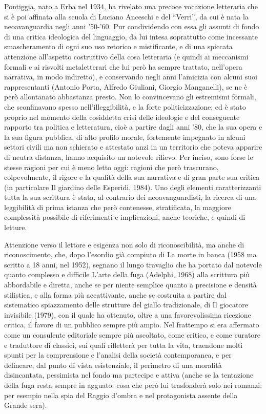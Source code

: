 Pontiggia, nato a Erba nel 1934, ha rivelato una precoce vocazione letteraria che si è poi affinata  alla scuola di Luciano Anceschi e del “Verri”, da cui è nata la neoavanguardia negli anni ’50-’60. Pur condividendo con essa gli assunti di fondo di una critica ideologica del linguaggio, da lui intesa soprattutto come incessante smascheramento di ogni suo uso retorico e mistificante, e di una spiccata attenzione all’aspetto costruttivo della cosa letteraria (e quindi ai meccanismi formali e ai risvolti metaletterari che lui però ha sempre trattato, nell’opera narrativa, in modo indiretto), e conservando negli anni l’amicizia con alcuni suoi rappresentanti (Antonio Porta, Alfredo Giuliani, Giorgio Manganelli), se ne è però allontanato abbastanza presto. Non lo convincevano gli estremismi formali, che sconfinavano spesso nell’illeggibilità, e la forte politicizzazione; ed è stato proprio nel momento della cosiddetta crisi delle ideologie e del conseguente rapporto tra politica e letteratura, cioè a partire dagli anni ’80, che la sua opera e la sua figura pubblica, di alto profilo morale, fortemente impegnato in alcuni settori civili ma non schierato e attestato anzi in un territorio che poteva apparire di neutra distanza, hanno acquisito un notevole rilievo. Per inciso, sono forse le stesse ragioni per cui è meno letto oggi: ragioni che però trascurano, colpevolmente, il rigore e la qualità della sua narrativa e di gran parte sua critica (in particolare Il giardino delle Esperidi, 1984).
Uno degli elementi caratterizzanti tutta la sua scrittura è stata, al contrario dei neoavanguardisti, la ricerca di una leggibilità di prima istanza che però contenesse, stratificata, la maggiore complessità possibile di riferimenti e implicazioni, anche teoriche, e quindi di letture.\newline

Attenzione verso il lettore e esigenza non solo di riconoscibilità, ma anche di riconoscimento, che, dopo l’esordio già compiuto di La morte in banca (1958 ma scritto a 18 anni, nel 1952), segnano il lungo travaglio che ha portato dal notevole quanto complesso e difficile L’arte della fuga (Adelphi, 1968) alla scrittura più abbordabile e diretta, anche se per niente semplice quanto a precisione e densità stilistica, e alla forma più accattivante, anche se costruita a partire dal sistematico spiazzamento delle strutture del giallo tradizionale, di Il giocatore invisibile (1979), con il quale ha ottenuto, oltre a una favorevolissima ricezione critica, il favore di un pubblico sempre più ampio. Nel frattempo si era affermato come un consulente editoriale sempre più ascoltato, come critico, e come curatore e traduttore di classici, sui quali rifletterà per tutta la vita, traendone molti spunti per la comprensione e l’analisi della società contemporanea, e per delineare, dal punto di vista esistenziale, il perimetro di una moralità disincantata, pessimista nel fondo ma partecipe e attiva (anche se la tentazione della fuga resta sempre in agguato: cosa che però lui trasfonderà solo nei romanzi: per esempio nella spia del Raggio d’ombra e nel protagonista assente della Grande sera).\newline

